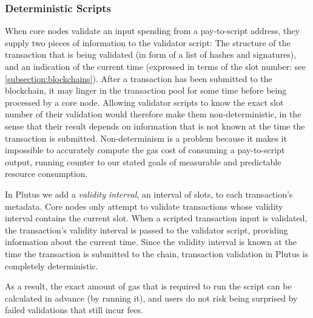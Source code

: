 \documentclass[a4paper]{article}
\theoremstyle{definition}  %
\begin{document}
\subsubsection{Deterministic Scripts}
\label{sec:deterministic-scripts}
When core nodes validate an input spending from a pay-to-script
address, they supply two pieces of information to the validator
script: The structure of the transaction that is being validated (in
form of a list of hashes and signatures), and an indication of the
current time (expressed in terms of the slot number: see
\ref{subsection:blockchains}).  After a transaction has been submitted
to the blockchain, it may linger in the transaction pool for some time
before being processed by a core node. Allowing validator scripts to
know the exact slot number of their validation would therefore make
them non-deterministic, in the sense that their result depends on
information that is not known at the time the transaction is
submitted.  Non-determinism is a problem because it makes it
impossible to accurately compute the gas cost of consuming a
pay-to-script output, running counter to our stated goals of
measurable and predictable resource consumption.

In Plutus we add a \emph{validity interval}, an interval of slots, to each 
transaction's metadata. Core nodes only attempt to validate transactions 
whose validity interval contains the current slot. When a scripted transaction 
input is validated, the transaction's validity interval is passed to the 
validator script, providing information about the current time. Since the 
validity interval is known at the time the transaction is submitted to the 
chain, transaction validation in Plutus is completely deterministic.

As a result, the exact amount of gas that is required to run the script can be 
calculated in advance (by running it), and users do not risk being surprised by 
failed validations that still incur fees.    
\end{document}
